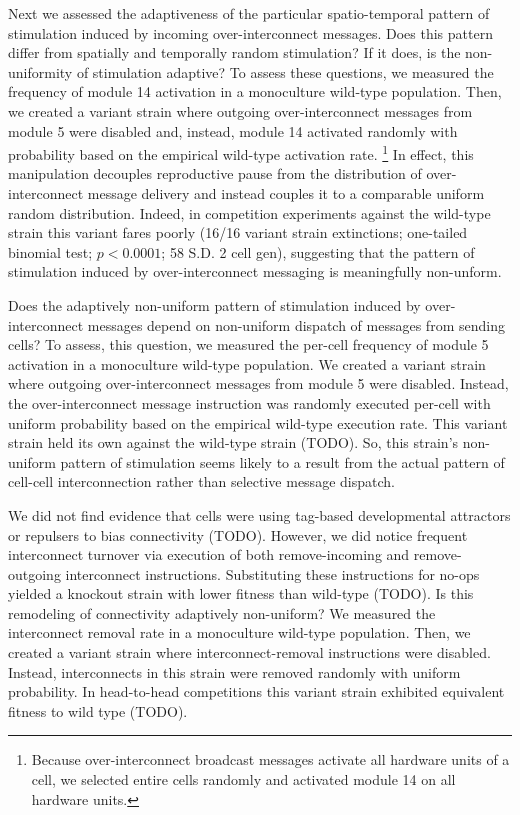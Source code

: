 Next we assessed the adaptiveness of the particular spatio-temporal pattern of stimulation induced by incoming over-interconnect  messages.
Does this pattern differ from spatially and temporally random stimulation?
If it does, is the non-uniformity of stimulation adaptive?
To assess these questions, we measured the frequency of module 14 activation in a monoculture wild-type population.
Then, we created a variant strain where outgoing over-interconnect messages from module 5 were disabled and, instead, module 14 activated randomly with probability based on the empirical wild-type activation rate.
\footnote{
Because over-interconnect broadcast messages activate all hardware units of a cell, we selected entire cells randomly and activated module 14 on all hardware units.
}
In effect, this manipulation decouples reproductive pause from the distribution of over-interconnect message delivery and instead couples it to a comparable uniform random distribution.
Indeed, in competition experiments against the wild-type strain this variant fares poorly (16/16 variant strain extinctions; one-tailed binomial test; $p < 0.0001$; 58 S.D. 2 cell gen), suggesting that the pattern of stimulation induced by over-interconnect messaging is meaningfully non-unform.

Does the adaptively non-uniform pattern of stimulation induced by over-interconnect messages depend on non-uniform dispatch of messages from sending cells?
To assess, this question, we measured the per-cell frequency of module 5 activation in a monoculture wild-type population.
We created a variant strain where outgoing over-interconnect messages from module 5 were disabled.
Instead, the over-interconnect message instruction was randomly executed per-cell with uniform probability based on the empirical wild-type execution rate.
This variant strain held its own against the wild-type strain (TODO).
So, this strain's non-uniform pattern of stimulation seems likely to a result from the actual pattern of cell-cell interconnection rather than selective message dispatch.

We did not find evidence that cells were using tag-based developmental attractors or repulsers to bias connectivity (TODO).
However, we did notice frequent interconnect turnover via execution of both remove-incoming and remove-outgoing interconnect instructions.
Substituting these instructions for no-ops yielded a knockout strain with lower fitness than wild-type (TODO).
Is this remodeling of connectivity adaptively non-uniform?
We measured the interconnect removal rate in a monoculture wild-type population.
Then, we created a variant strain where interconnect-removal instructions were disabled.
Instead, interconnects in this strain were removed randomly with uniform probability.
In head-to-head competitions this variant strain exhibited equivalent fitness to wild type (TODO).


